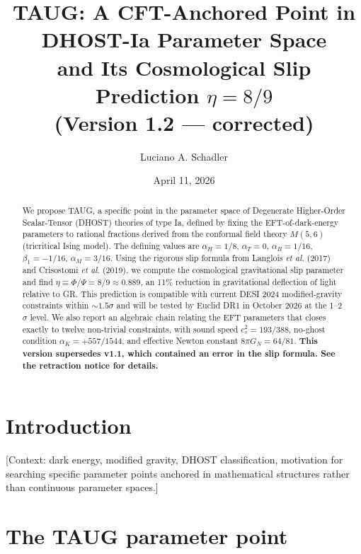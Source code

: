 \documentclass[aps,prd,twocolumn,floatfix,nofootinbib]{revtex4-2}
\begin{document}
\title{TAUG: A CFT-Anchored Point in DHOST-Ia Parameter Space \\
       and Its Cosmological Slip Prediction $\eta = 8/9$ \\
       (Version 1.2 --- corrected)}

\author{Luciano A. Schadler}

\date{April 11, 2026}

\begin{abstract}
We propose TAUG, a specific point in the parameter space of
Degenerate Higher-Order Scalar-Tensor (DHOST) theories of type Ia,
defined by fixing the EFT-of-dark-energy parameters to rational
fractions derived from the conformal field theory $M(5,6)$
(tricritical Ising model). The defining values are
$\alpha_H = 1/8$, $\alpha_T = 0$, $\alpha_B = 1/16$,
$\beta_1 = -1/16$, $\alpha_M = 3/16$. Using the rigorous slip formula
from Langlois \emph{et al.} (2017) and Crisostomi \emph{et al.}
(2019), we compute the cosmological gravitational slip parameter
and find $\eta \equiv \Phi/\Psi = 8/9 \approx 0.889$, an 11\%
reduction in gravitational deflection of light relative to GR.
This prediction is compatible with current DESI 2024 modified-gravity
constraints within $\sim 1.5\sigma$ and will be tested by Euclid DR1
in October 2026 at the 1--2$\sigma$ level. We also report an
algebraic chain relating the EFT parameters that closes exactly
to twelve non-trivial constraints, with sound speed
$c_s^2 = 193/388$, no-ghost condition $\alpha_K = +557/1544$, and
effective Newton constant $8\pi G_N = 64/81$. \textbf{This version
supersedes v1.1, which contained an error in the slip formula.
See the retraction notice for details.}
\end{abstract}

\maketitle

\section{Introduction}
[Context: dark energy, modified gravity, DHOST classification, motivation
for searching specific parameter points anchored in mathematical
structures rather than continuous parameter spaces.]

\section{The TAUG parameter point}
\end{document}
